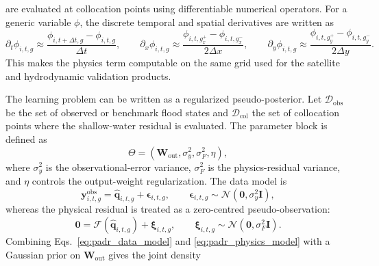\documentclass[pdflatex,sn-mathphys-ay]{sn-jnl}
\theoremstyle{thmstyleone}
\theoremstyle{thmstylethree}
\theoremstyle{thmstyletwo}
\begin{document}
are evaluated at collocation points using differentiable numerical
operators.  For a generic variable $\phi$, the discrete temporal and
spatial derivatives are written as
\begin{equation}
  \partial_{t}\phi_{i,t,g}
  \approx
  \frac{
    \phi_{i,t+\Delta t,g}
    -
    \phi_{i,t,g}
  }{\Delta t},
  \qquad
  \partial_{x}\phi_{i,t,g}
  \approx
  \frac{
    \phi_{i,t,g^{+}_{x}}
    -
    \phi_{i,t,g^{-}_{x}}
  }{2\Delta x},
  \qquad
  \partial_{y}\phi_{i,t,g}
  \approx
  \frac{
    \phi_{i,t,g^{+}_{y}}
    -
    \phi_{i,t,g^{-}_{y}}
  }{2\Delta y}.
  \label{eq:padr_discrete_derivatives}
\end{equation}
This makes the physics term computable on the same grid used for the
satellite and hydrodynamic validation products.

The learning problem can be written as a regularized
pseudo-posterior.  Let
$\mathcal{D}_{\mathrm{obs}}$ be the set of observed or benchmark flood
states and $\mathcal{D}_{\mathrm{col}}$ the set of collocation points
where the shallow-water residual is evaluated.  The parameter block is
defined as
\begin{equation}
  \Theta
  =
  \left(
    \mathbf{W}_{\mathrm{out}},
    \sigma^{2}_{y},
    \sigma^{2}_{F},
    \eta
  \right),
  \label{eq:padr_parameter_block}
\end{equation}
where $\sigma^{2}_{y}$ is the observational-error variance,
$\sigma^{2}_{F}$ is the physics-residual variance, and $\eta$ controls
the output-weight regularization.  The data model is
\begin{equation}
  \mathbf{y}^{\mathrm{obs}}_{i,t,g}
  =
  \hat{\mathbf{q}}_{i,t,g}
  +
  \boldsymbol{\epsilon}_{i,t,g},
  \qquad
  \boldsymbol{\epsilon}_{i,t,g}
  \sim
  \mathcal{N}
  \left(
    \mathbf{0},
    \sigma^{2}_{y}\mathbf{I}
  \right),
  \label{eq:padr_data_model}
\end{equation}
whereas the physical residual is treated as a zero-centred
pseudo-observation:
\begin{equation}
  \mathbf{0}
  =
  \mathcal{F}
  \left(
    \hat{\mathbf{q}}_{i,t,g}
  \right)
  +
  \boldsymbol{\xi}_{i,t,g},
  \qquad
  \boldsymbol{\xi}_{i,t,g}
  \sim
  \mathcal{N}
  \left(
    \mathbf{0},
    \sigma^{2}_{F}\mathbf{I}
  \right).
  \label{eq:padr_physics_model}
\end{equation}
Combining Eqs.~\eqref{eq:padr_data_model} and
\eqref{eq:padr_physics_model} with a Gaussian prior on
$\mathbf{W}_{\mathrm{out}}$ gives the joint density
\end{document}
